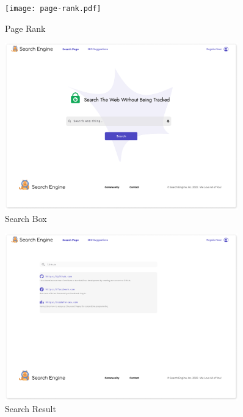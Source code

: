 \documentclass{scrartcl}
\begin{document}
\begin{figure}[H]
  \centering
  \texttt{[image: page-rank.pdf]}
  \caption{Page Rank}
\end{figure}

\begin{figure}[H]
  \centering
  \includegraphics[width=0.90\textwidth]{search-box.pdf}
  \caption{Search Box}
\end{figure}

\begin{figure}[H]
  \centering
  \includegraphics[width=0.90\textwidth]{search-result.pdf}
  \caption{Search Result}
\end{figure}
\end{document}

